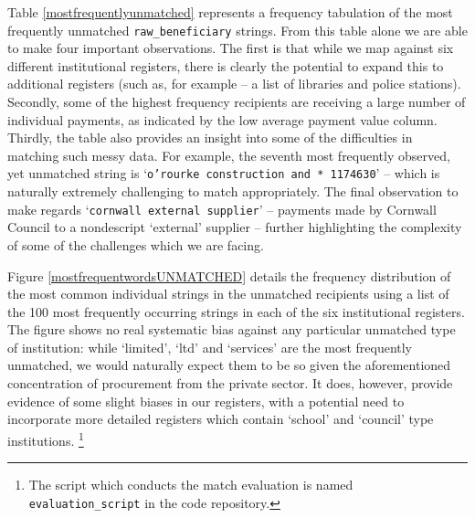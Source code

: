 \documentclass[12pt]{article}
\begin{document}
Table \ref{mostfrequentlyunmatched} represents a frequency tabulation of the most frequently unmatched \texttt{raw\_beneficiary} strings. From this table alone we are able to make four important observations. The first is that while we map against six different institutional registers, there is clearly the potential to expand this to additional registers (such as, for example -- a list of libraries and police stations). Secondly, some of the highest frequency recipients are receiving a large number of individual  payments, as indicated by the low average payment value column. Thirdly, the table also provides an insight into some of the difficulties in matching such messy data. For example, the seventh most frequently observed, yet unmatched string is `\texttt{o'rourke construction and * 1174630}' -- which is naturally extremely challenging to match appropriately. The final observation to make regards `\texttt{cornwall external supplier}' -- payments made by Cornwall Council to a nondescript `external' supplier -- further highlighting the complexity of some of the challenges which we are facing.

Figure \ref{mostfrequentwordsUNMATCHED} details the frequency distribution of the most common individual strings in the unmatched recipients using a list of the 100 most frequently occurring strings in each of the six institutional registers. The figure shows no real systematic bias against any particular unmatched type of institution: while `limited', `ltd' and `services' are the most frequently unmatched, we would naturally expect them to be so given the aforementioned concentration of procurement from the private sector. It does, however, provide evidence of some slight biases in our registers, with a potential need to incorporate more detailed registers which contain `school' and `council' type institutions. \footnote{The script which conducts the match evaluation is named \texttt{evaluation\_script} in the code repository.}
\end{document}
